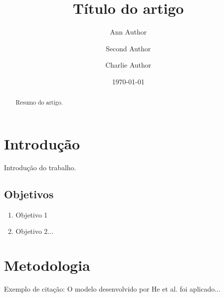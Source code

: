 \documentclass[%
 reprint,
 amsmath,amssymb,
 aps,
]{revtex4-2}
\begin{document}
\title{Título do artigo} 

\author{Ann Author}

\author{Second Author}%
%

\author{Charlie Author}
%
%

\date{\today}%

\begin{abstract}
Resumo do artigo.

\end{abstract}

\maketitle


\section{Introdução}
\label{sec:level1}

Introdução do trabalho.

\subsection{Objetivos}
\label{sec:obj}

\begin{enumerate}
    \item Objetivo 1
    \item Objetivo 2...
\end{enumerate}

\section{Metodologia}
\label{sec:metodologia}

Exemplo de citação: O modelo desenvolvido por He et al. \cite{he2016deep} foi aplicado...
\end{document}
